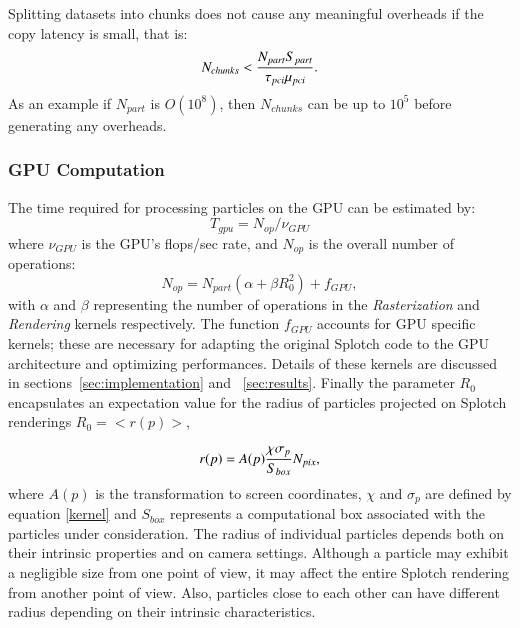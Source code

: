 \documentclass[1p]{elsarticle}
\begin{document}
Splitting datasets into chunks does not cause any meaningful overheads if the copy latency is small, that is:
\begin{equation}
N_{chunks} < {N_{part} S_{part}\over \tau_{pci}\mu_{pci}}.
\end{equation}
As an example if $N_{part}$ is $O(10^8)$, then $N_{chunks}$ can be up to $10^5$ before
generating any overheads. 

\subsubsection{GPU Computation}
The time required for processing particles on the GPU can be estimated by:
\begin{equation}
T_{gpu} = N_{op}/\nu_{GPU}
\end{equation}
where $\nu_{GPU}$ is the GPU's flops/sec rate, and $N_{op}$ is the overall number of operations:
\begin{equation}\label{ops}
N_{op} = N_{part}(\alpha + \beta R_0^2) + f_{GPU},
\end{equation}
with $\alpha$ and $\beta$ representing the number of operations in the \textit{Rasterization} and \textit{Rendering} kernels respectively.
The function $f_{GPU}$ accounts for GPU specific kernels; these are necessary for adapting the original Splotch code to the GPU architecture and optimizing performances. Details of these kernels are discussed in sections~\ref{sec:implementation} and ~\ref{sec:results}.
Finally the parameter $R_0$ encapsulates an expectation value for the radius of particles projected on Splotch renderings $R_0 = <r(p)>$,

\begin{equation}\label{radius}
r(p) = A(p){\chi \sigma_p\over S_{box}} N_{pix},
\end{equation} 
where $A(p)$ is the transformation to screen coordinates, $\chi$ and $\sigma_p$ are defined by equation \eqref{kernel} and $S_{box}$ represents a computational box associated with the particles under consideration. 
The radius of individual particles depends both on their intrinsic properties and on camera settings. Although a particle may exhibit a negligible size from one point of view, it may affect the entire Splotch rendering from another point of view. Also, particles close to each other can have different radius depending on their intrinsic characteristics.
\end{document}
